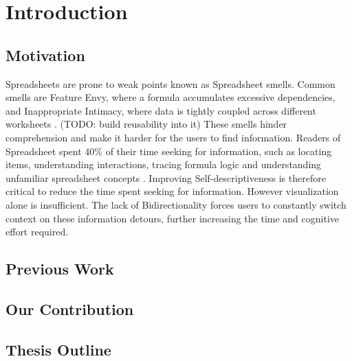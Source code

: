 \chapter{Introduction}\label{ch:thesis_introduction}
\section*{Motivation}
Spreadsheets are prone to weak points known as Spreadsheet smells. Common smells are Feature Envy, where a formula accumulates excessive dependencies, and Inappropriate Intimacy, where data is tightly coupled across different worksheets \cite{hermans_detecting_2012}. (TODO: build reusability into it)
These smells hinder comprehension and make it harder for the users to find information. Readers of Spreadsheet spent 40\% of their time seeking for information, such as locating items, understanding interactions, tracing formula logic and understanding unfamiliar spreadsheet concepts \cite{srinivasa_ragavan_spreadsheet_2021}.
Improving Self-descriptiveness is therefore critical to reduce the time spent seeking for information. However visualization alone is insufficient. The lack of Bidirectionality forces users to constantly switch context on these information detours, further increasing the time and cognitive effort required.

\section*{Previous Work}



\section*{Our Contribution}

\section*{Thesis Outline}